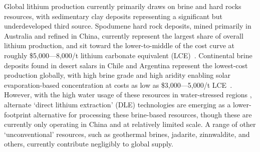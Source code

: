 \documentclass{article}
\renewcommand\_{\textunderscore\allowbreak}
\begin{document}
Global lithium production currently primarily draws on brine and hard rocks resources, with sedimentary clay deposits representing a significant but underdeveloped third source. Spodumene hard rock deposits, mined primarily in Australia and refined in China, currently represent the largest share of overall lithium production, and sit toward the lower-to-middle of the cost curve at roughly \$5,000---8,000/t lithium carbonate equivalent (LCE)~\cite{flemingLongrunAvailabilityMineral2024, wesselkaemperOptimizationProcessingCosts2025}. Continental brine deposits found in desert salars in Chile and Argentina represent the lowest-cost production globally, with high brine grade and high aridity enabling solar evaporation-based concentration at costs as low as \$3,000---5,000/t LCE~\cite{flemingLongrunAvailabilityMineral2024}. However, with the high water usage of these resources in water-stressed regions \cite{sunRobustAssessmentsLithium2025, halkesLifeCycleAssessment2024}, alternate `direct lithium extraction' (DLE) technologies are emerging as a lower-footprint alternative for processing these brine-based resources, though these are currently only operating in China and at relatively limited scale. A range of other `unconventional' resources, such as geothermal brines, jadarite, zinnwaldite, and others, currently contribute negligibly to global supply. 
\end{document}

